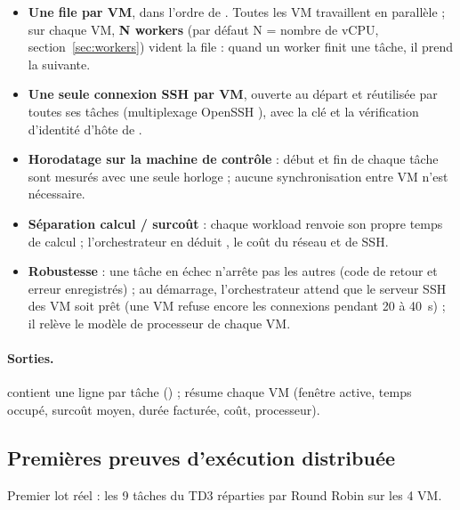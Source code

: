 \begin{itemize}
  \item \textbf{Une file par VM}, dans l'ordre de . Toutes les
        VM travaillent en parallèle ; sur chaque VM, \textbf{N workers} (par défaut
        N = nombre de vCPU, section~\ref{sec:workers}) vident la file : quand un
        worker finit une tâche, il prend la suivante.
  \item \textbf{Une seule connexion SSH par VM}, ouverte au départ et réutilisée par
        toutes ses tâches (multiplexage OpenSSH ), avec la clé et
        la vérification d'identité d'hôte de .
  \item \textbf{Horodatage sur la machine de contrôle} : début et fin de chaque
        tâche sont mesurés avec une seule horloge ; aucune synchronisation entre VM
        n'est nécessaire.
  \item \textbf{Séparation calcul / surcoût} : chaque workload renvoie son propre
        temps de calcul ; l'orchestrateur en déduit
        , le coût du réseau et de SSH.
  \item \textbf{Robustesse} : une tâche en échec n'arrête pas les autres (code de
        retour et erreur enregistrés) ; au démarrage, l'orchestrateur attend que le
        serveur SSH des VM soit prêt (une VM  refuse encore les
        connexions pendant 20 à 40~s) ; il relève le modèle de processeur de chaque VM.
\end{itemize}

\paragraph{Sorties.}  contient une ligne par tâche
() ; 
résume chaque VM (fenêtre active, temps occupé, surcoût moyen, durée facturée,
coût, processeur).

\subsection{Premières preuves d'exécution distribuée}

Premier lot réel : les 9 tâches du TD3 réparties par Round Robin sur les 4 VM.

